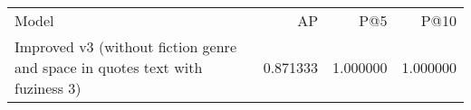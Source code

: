 \begin{tabular}{lrrr}
Model & AP & P@5 & P@10 \\
Improved v3 (without fiction genre and space in quotes text with fuziness 3) & 0.871333 & 1.000000 & 1.000000 \\
\end{tabular}
